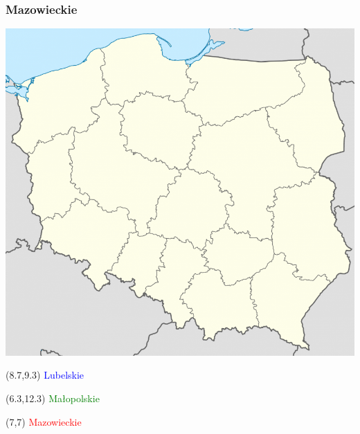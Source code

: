 \documentclass{beamer}
\begin{document}
\begin{frame}
\frametitle{Mazowieckie}
\includegraphics[scale=0.25]{Polska}
\begin{textblock}{3}(8.7,9.3)
\textcolor{blue}{Lubelskie}
\end{textblock}
\begin{textblock}{3}(6.3,12.3)
\textcolor{green}{Małopolskie}
\end{textblock}
\begin{textblock}{3}(7,7)
\textcolor{red}{Mazowieckie}
\end{textblock}
\end{frame}
\end{document}
